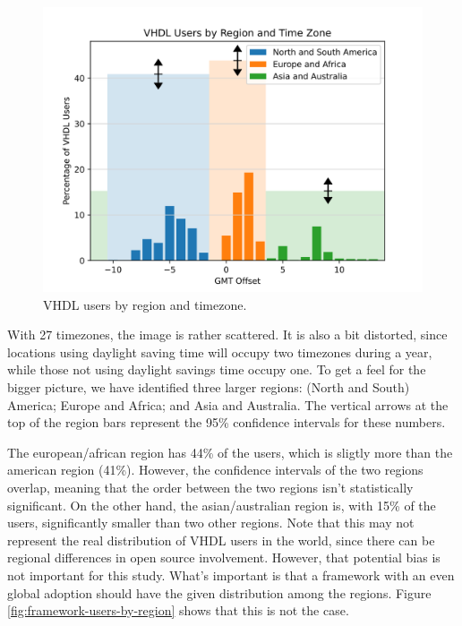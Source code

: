 \documentclass[]{article}
\begin{document}
\begin{figure}

{\centering \includegraphics[width=0.85\linewidth]{img/vhdl_timezone_chart} 

}

\caption{VHDL users by region and timezone.}\label{fig:vhdl-users-by-region}
\end{figure}

With 27 timezones, the image is rather scattered. It is also a bit distorted, since locations using daylight saving time will occupy two timezones during a year, while those not using daylight savings time occupy one. To get a feel for the bigger picture, we have identified three larger regions: (North and South) America; Europe and Africa; and Asia and Australia. The vertical arrows at the top of the region bars represent the 95\% confidence intervals for these numbers.

The european/african region has 44\% of the users, which is sligtly more than the american region (41\%). However, the confidence intervals of the two regions overlap, meaning that the order between the two regions isn't statistically significant. On the other hand, the asian/australian region is, with 15\% of the users, significantly smaller than two other regions. Note that this may not represent the real distribution of VHDL users in the world, since there can be regional differences in open source involvement. However, that potential bias is not important for this study. What's important is that a framework with an even global adoption should have the given distribution among the regions. Figure \ref{fig:framework-users-by-region} shows that this is not the case.
\end{document}
